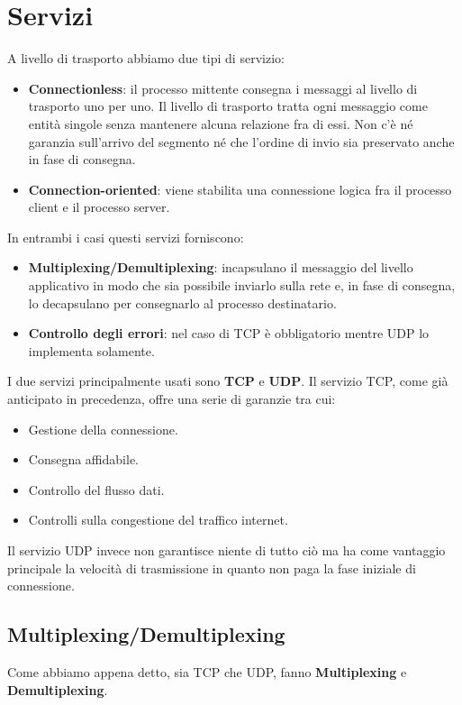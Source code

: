 \section{Servizi}
A livello di trasporto abbiamo due tipi di servizio:
\begin{itemize}
	\item \textbf{Connectionless}: il processo mittente consegna i 
		messaggi al livello di trasporto uno per uno. Il livello di 
		trasporto tratta ogni messaggio come entità singole senza 
		mantenere alcuna relazione fra di essi. Non c'è né garanzia 
		sull'arrivo del segmento né che l'ordine di invio sia 
		preservato anche in fase di consegna.
	\item \textbf{Connection-oriented}: viene stabilita una connessione
		logica fra il processo client e il processo server.
\end{itemize}
In entrambi i casi questi servizi forniscono:
\begin{itemize}
	\item \textbf{Multiplexing/Demultiplexing}: incapsulano il 
		messaggio del livello applicativo in modo che sia possibile 
		inviarlo sulla rete e, in fase di consegna, lo decapsulano per
		consegnarlo al processo destinatario.
	\item \textbf{Controllo degli errori}: nel caso di TCP è 
		obbligatorio mentre UDP lo implementa solamente.
\end{itemize}
I due servizi principalmente usati sono \textbf{TCP} e \textbf{UDP}. Il
servizio TCP, come già anticipato in precedenza, offre una serie di 
garanzie tra cui:
\begin{itemize}
	\item Gestione della connessione.
	\item Consegna affidabile.
	\item Controllo del flusso dati.
	\item Controlli sulla congestione del traffico internet.
\end{itemize}
Il servizio UDP invece non garantisce niente di tutto ciò ma ha come
vantaggio principale la velocità di trasmissione in quanto non paga la 
fase iniziale di connessione.

\subsection{Multiplexing/Demultiplexing}
Come abbiamo appena detto, sia TCP che UDP, fanno \textbf{Multiplexing}
e \textbf{Demultiplexing}.

